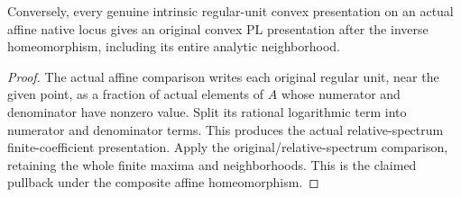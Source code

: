 \begin{lemma}
\label{berkovich:actual-affine-convexity-to-paper}
\leanok
{}
Conversely, every genuine intrinsic regular-unit convex presentation on an
actual affine native locus gives an original convex PL presentation after
the inverse homeomorphism, including its entire analytic neighborhood.
\end{lemma}
\begin{proof}
The actual affine comparison writes each original regular unit, near the
given point, as a fraction of actual elements of $A$ whose numerator and
denominator have nonzero value. Split its rational logarithmic term into
numerator and denominator terms. This produces the actual relative-spectrum
finite-coefficient presentation. Apply the original/relative-spectrum
comparison, retaining the whole finite maxima and neighborhoods. This is
the claimed pullback under the composite affine homeomorphism.
\end{proof}
